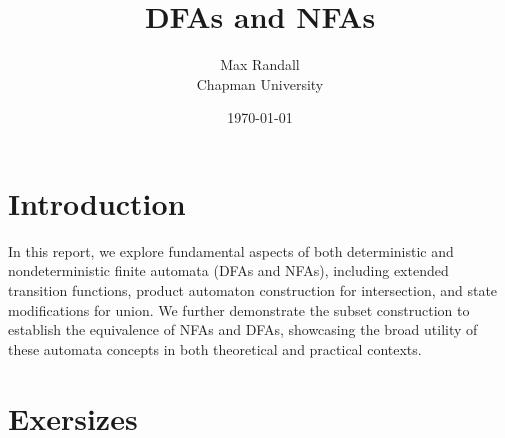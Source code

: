 \documentclass{article}
\title{DFAs and NFAs}
\author{Max Randall \\ Chapman University}
\date{\today}
\theoremstyle{theorem}
\theoremstyle{definition}
\theoremstyle{remark}
\begin{document}
\maketitle

\setcounter{tocdepth}{3}
\tableofcontents

\section{Introduction}\label{sec:intro}
In this report, we explore fundamental aspects of both deterministic and nondeterministic finite automata (DFAs and NFAs), including extended transition functions, product automaton construction for intersection, and state modifications for union. We further demonstrate the subset construction to establish the equivalence of NFAs and DFAs, showcasing the broad utility of these automata concepts in both theoretical and practical contexts.
\newpage
\section{Exersizes}\label{sec:week-by-week}

\noindent
\end{document}
